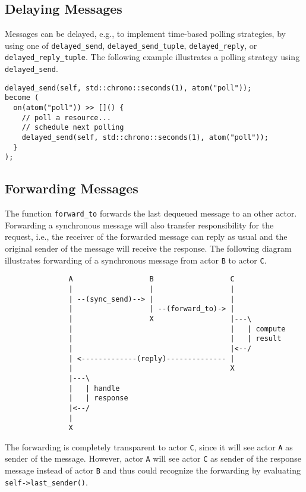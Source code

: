 \subsection{Delaying Messages}

Messages can be delayed, e.g., to implement time-based polling strategies, by using one of \lstinline^delayed_send^, \lstinline^delayed_send_tuple^, \lstinline^delayed_reply^, or \lstinline^delayed_reply_tuple^.
The following example illustrates a polling strategy using \lstinline^delayed_send^.

\begin{lstlisting}
delayed_send(self, std::chrono::seconds(1), atom("poll"));
become (
  on(atom("poll")) >> []() {
    // poll a resource...
    // schedule next polling
    delayed_send(self, std::chrono::seconds(1), atom("poll"));
  }
);
\end{lstlisting}

\clearpage
\subsection{Forwarding Messages}

The function \lstinline^forward_to^ forwards the last dequeued message to an other actor.
Forwarding a synchronous message will also transfer responsibility for the request, i.e., the receiver of the forwarded message can reply as usual and the original sender of the message will receive the response.
The following diagram illustrates forwarding of a synchronous message from actor \texttt{B} to actor \texttt{C}.

\begin{footnotesize}
\begin{verbatim}
               A                  B                  C
               |                  |                  |
               | --(sync_send)--> |                  |
               |                  | --(forward_to)-> |
               |                  X                  |---\
               |                                     |   | compute
               |                                     |   | result
               |                                     |<--/
               | <-------------(reply)-------------- |
               |                                     X
               |---\
               |   | handle
               |   | response
               |<--/
               |
               X
\end{verbatim}
\end{footnotesize}

The forwarding is completely transparent to actor \texttt{C}, since it will see actor \texttt{A} as sender of the message.
However, actor \texttt{A} will see actor \texttt{C} as sender of the response message instead of actor \texttt{B} and thus could recognize the forwarding by evaluating \lstinline^self->last_sender()^.